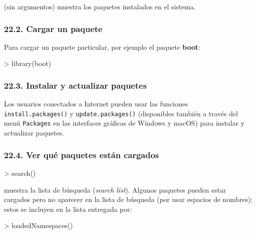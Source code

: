 \documentclass[
  jou,
  floatsintext,
  longtable,
  a4paper,
  nolmodern,
  notxfonts,
  notimes,
  12pt,
  colorlinks=true,linkcolor=blue,citecolor=blue,urlcolor=blue]{apa7}
\newenvironment{Shaded}{\begin{snugshade}}{\end{snugshade}}
\newcommand{\FunctionTok}[1]{\textcolor[rgb]{0.28,0.35,0.67}{#1}}
\newcommand{\NormalTok}[1]{\textcolor[rgb]{0.00,0.23,0.31}{#1}}
\newcommand{\SpecialCharTok}[1]{\textcolor[rgb]{0.37,0.37,0.37}{#1}}
\begin{document}
(sin argumentos) muestra los paquetes instalados en el sistema.

\subsubsection{22.2. Cargar un paquete}\label{cargar-un-paquete}

Para cargar un paquete particular, por ejemplo el paquete \textbf{boot}:

\begin{Shaded}
\begin{Highlighting}[]
\SpecialCharTok{\textgreater{}} \FunctionTok{library}\NormalTok{(boot)}
\end{Highlighting}
\end{Shaded}

\subsubsection{22.3. Instalar y actualizar
paquetes}\label{instalar-y-actualizar-paquetes}

Los usuarios conectados a Internet pueden usar las funciones
\texttt{install.packages()} y \texttt{update.packages()} (disponibles
también a través del menú \texttt{Packages} en las interfaces gráficas
de Windows y macOS) para instalar y actualizar paquetes.

\subsubsection{22.4. Ver qué paquetes están
cargados}\label{ver-quuxe9-paquetes-estuxe1n-cargados}

\begin{Shaded}
\begin{Highlighting}[]
\SpecialCharTok{\textgreater{}} \FunctionTok{search}\NormalTok{()}
\end{Highlighting}
\end{Shaded}

muestra la lista de búsqueda (\emph{search list}). Algunos paquetes
pueden estar cargados pero no aparecer en la lista de búsqueda (por usar
espacios de nombres); estos se incluyen en la lista entregada por:

\begin{Shaded}
\begin{Highlighting}[]
\SpecialCharTok{\textgreater{}} \FunctionTok{loadedNamespaces}\NormalTok{()}
\end{Highlighting}
\end{Shaded}
\end{document}
